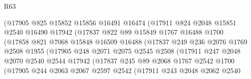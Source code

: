 \begin{lexlean}{R63}
\begin{coremodule}
                        (@17905
                          @825
                          @15852
                          @15856
                          @16491
                          @16474
                          (@17911
                            @824
                            @2048
                            @15851
                            @2540
                            @16490
                            @17942
                            (@17837
                              @822
                              @89
                              @15849
                              @1767
                              @16488
                              @1700
                              (@17858
                                @821
                                @7068
                                @15848
                                @16509
                                @16488
                                (@17837
                                  @249
                                  @236
                                  @2076
                                  @1769
                                  @2508
                                  @1955
                                  (@17905
                                    @248
                                    @2071
                                    @2075
                                    @2545
                                    @2508
                                    (@17911
                                      @247
                                      @2048
                                      @2070
                                      @2540
                                      @2544
                                      @17942
                                      (@17837
                                        @245
                                        @89
                                        @2068
                                        @1767
                                        @2542
                                        @1700
                                        (@17905
                                          @244
                                          @2063
                                          @2067
                                          @2597
                                          @2542
                                          (@17911
                                            @243
                                            @2048
                                            @2062
                                            @2540

\end{coremodule}
\end{lexlean}
